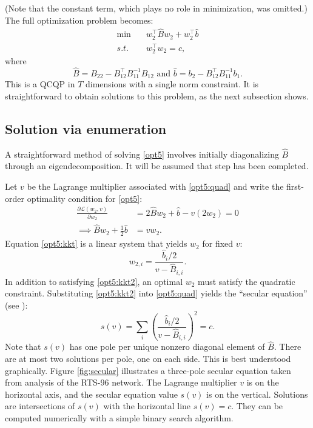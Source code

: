 \documentclass[conference]{IEEEtran}
\begin{document}
(Note that the constant term, which plays no role in minimization, was
omitted.) The full optimization problem becomes:
\begin{subequations}\label{opt5}
\begin{align}
\min\quad & w_2^\top \hat{B}w_2 + w_2^\top \hat{b} \\
\label{opt5:quad} s.t.\quad & w_2^\top w_2 = c,
\end{align}
\end{subequations}
where
\[
\hat{B} = B_{22} - B_{12}^\top B_{11}^{-1}B_{12} \text{ and }\hat{b} = b_2 - B_{12}^\top B_{11}^{-1}b_1.
\]
This is a QCQP in $T$ dimensions with a single norm constraint. It is
straightforward to obtain solutions to this problem, as the next
subsection shows.

\subsection{Solution via enumeration}

A straightforward method of solving \eqref{opt5} involves initially
diagonalizing $\hat{B}$ through an eigendecomposition. It will be
assumed that step has been completed.

Let $v$ be the Lagrange multiplier associated with \eqref{opt5:quad}
and write the first-order optimality condition for \eqref{opt5}:
\begin{align}
\nonumber \frac{\partial \mathcal{L}(w_2,v)}{\partial w_2} &= 2\hat{B}w_2 + \hat{b} - v(2w_2) = 0 \\
\label{opt5:kkt} \implies \hat{B}w_2 + \frac{1}{2}\hat{b} &= vw_2.
\end{align}
Equation \eqref{opt5:kkt} is a linear system that yields $w_2$ for fixed $v$:
\begin{equation}
\label{opt5:kkt2}w_{2,i} = \frac{\hat{b}_i/2}{v - \hat{B}_{i,i}}.
\end{equation}
In addition to satisfying \eqref{opt5:kkt2}, an optimal $w_2$ must
satisfy the quadratic constraint. Substituting \eqref{opt5:kkt2} into
\eqref{opt5:quad} yields the ``secular equation'' (see
\cite{bienstock2014}):
\begin{equation}
s(v) = \sum_{i}\left( \frac{\hat{b}_i /2}{v - \hat{B}_{i,i}}\right)^2 = c.
\end{equation}
Note that $s(v)$ has one pole per unique nonzero diagonal element of
$\hat{B}$. There are at most two solutions per pole, one on each
side. This is best understood graphically. Figure \ref{fig:secular}
illustrates a three-pole secular equation taken from analysis of the
RTS-96 network. The Lagrange multiplier $v$ is on the horizontal axis,
and the secular equation value $s(v)$ is on the vertical. Solutions
are intersections of $s(v)$ with the horizontal line $s(v)=c$. They
can be computed numerically with a simple binary search algorithm.
\end{document}
